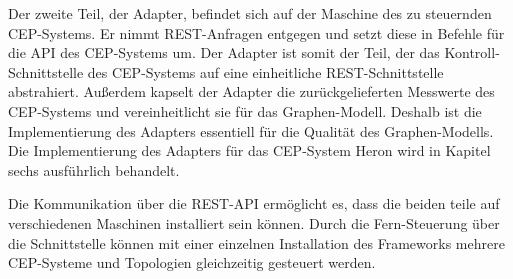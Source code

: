 Der zweite Teil, der Adapter, befindet sich auf der Maschine des zu steuernden CEP-Systems.
Er nimmt REST-Anfragen entgegen und setzt diese in Befehle für die API des CEP-Systems um.
Der Adapter ist somit der Teil, der das Kontroll-Schnittstelle des CEP-Systems auf eine einheitliche REST-Schnittstelle abstrahiert.
Außerdem kapselt der Adapter die zurückgelieferten Messwerte des CEP-Systems und vereinheitlicht sie für das Graphen-Modell.
Deshalb ist die Implementierung des Adapters essentiell für die Qualität des Graphen-Modells.
Die Implementierung des Adapters für das CEP-System Heron wird in Kapitel sechs ausführlich behandelt.

Die Kommunikation über die REST-API ermöglicht es, dass die beiden teile auf verschiedenen Maschinen installiert sein können.
Durch die Fern-Steuerung über die Schnittstelle können mit einer einzelnen Installation des Frameworks mehrere CEP-Systeme und Topologien gleichzeitig gesteuert werden.



















